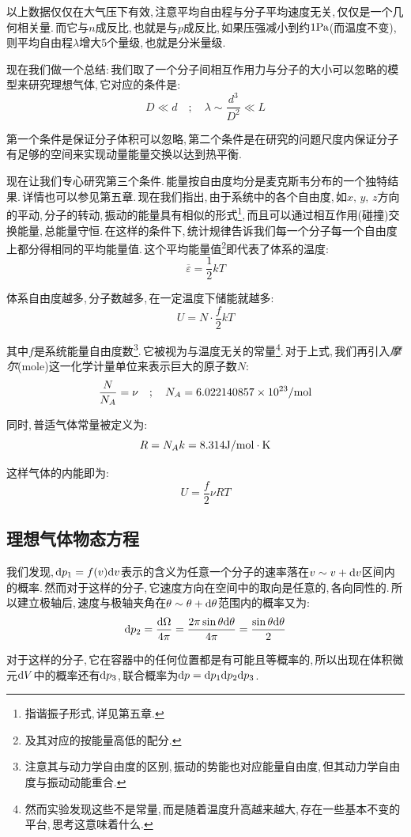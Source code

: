 以上数据仅仅在大气压下有效,\,注意平均自由程与分子平均速度无关,\,仅仅是一个几何相关量.\,而它与$n$成反比,\,也就是与$p$成反比,\,如果压强减小到约$1{\rm Pa}$(而温度不变),\,则平均自由程$\lambda$增大5个量级,\,也就是分米量级.

现在我们做一个总结:\,我们取了一个分子间相互作用力与分子的大小可以忽略的模型来研究理想气体,\,它对应的条件是:
\[D \ll d \quad ; \quad \lambda\sim\frac{d^3}{D^2} \ll L\]

第一个条件是保证分子体积可以忽略,\,第二个条件是在研究的问题尺度内保证分子有足够的空间来实现动量能量交换以达到热平衡.

现在让我们专心研究第三个条件.\,能量按自由度均分是麦克斯韦分布的一个独特结果.\,详情也可以参见第五章.\,现在我们指出,\,由于系统中的各个自由度,\,如$x,\,y,\,z$方向的平动,\,分子的转动,\,振动的能量具有相似的形式\footnote{指谐振子形式,\,详见第五章.},\,而且可以通过相互作用(碰撞)交换能量,\,总能量守恒.\,在这样的条件下,\,统计规律告诉我们每一个分子每一个自由度上都分得相同的平均能量值.\,这个平均能量值\footnote{及其对应的按能量高低的配分.}即代表了体系的温度:
\[\overline{\varepsilon}=\frac{1}{2}kT\]

体系自由度越多,\,分子数越多,\,在一定温度下储能就越多:
\[U=N\cdot\frac{f}{2}kT\]

其中$f$是系统能量自由度数\footnote{注意其与动力学自由度的区别,\,振动的势能也对应能量自由度,\,但其动力学自由度与振动动能重合.}.\,它被视为与温度无关的常量\footnote{然而实验发现这些不是常量,\,而是随着温度升高越来越大,\,存在一些基本不变的平台,\,思考这意味着什么.}.\,对于上式,\,我们再引入\emph{摩尔}(mole)这一化学计量单位来表示巨大的原子数$N$:
\[\frac{N}{N_A}=\nu \quad ; \quad N_A=6.022140857\times 10^{23}/{\rm mol}\]

同时,\,普适气体常量被定义为:
\[R=N_A k=8.314{\rm J/mol\cdot K}\]

这样气体的内能即为:
\[U=\frac{f}{2}\nu RT\]

\subsection{理想气体物态方程}
我们发现,\,$\textrm{d} p_1=f(v)\textrm{d} v$表示的含义为任意一个分子的速率落在$v\sim v+\textrm{d} v$区间内的概率.\,然而对于这样的分子,\,它速度方向在空间中的取向是任意的,\,各向同性的.\,所以建立极轴后,\,速度与极轴夹角在$\theta\sim\theta+\textrm{d} \theta$范围内的概率又为:
\[\textrm{d} p_2=\frac{\textrm{d} \Omega}{4\pi}=\frac{2\pi\sin\theta\textrm{d}\theta}{4\pi}=\frac{\sin\theta\textrm{d}\theta}{2}\]

对于这样的分子,\,它在容器中的任何位置都是有可能且等概率的,\,所以出现在体积微元$\textrm{d} V$中的概率还有$\textrm{d} p_3$,\,联合概率为$\textrm{d} p=\textrm{d} p_1\textrm{d} p_2\textrm{d} p_3$.

